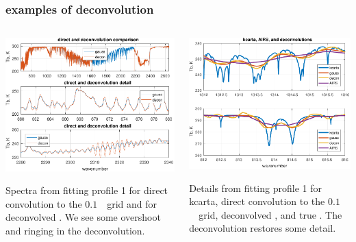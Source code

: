\documentclass[10pt]{beamer}
\begin{document}
\begin{frame}
\frametitle{examples of deconvolution}
\begin{columns}[t]
\begin{column}{0.5\textwidth}
  \begin{centering}
  \includegraphics[width=\textwidth]{figures/airs_decon_spec.pdf}
  \end{centering}\vspace{3mm}
  Spectra from fitting profile 1 for direct convolution to the
  $0.1$~\wn\ grid and for deconvolved {\airs}.  We see some
  overshoot and ringing in the deconvolution.

\end{column}
\begin{column}{0.5\textwidth}  
  \begin{centering}
  \includegraphics[width=\textwidth]{figures/airs_decon_zoom.pdf}
  \end{centering}\vspace{2mm}
  Details from fitting profile 1 for kcarta, direct convolution to
  the $0.1$~\wn\ grid, deconvolved {\airs}, and true {\airs}.  The
  deconvolution restores some detail.
\end{column}
\end{columns}
\end{frame}
\end{document}

